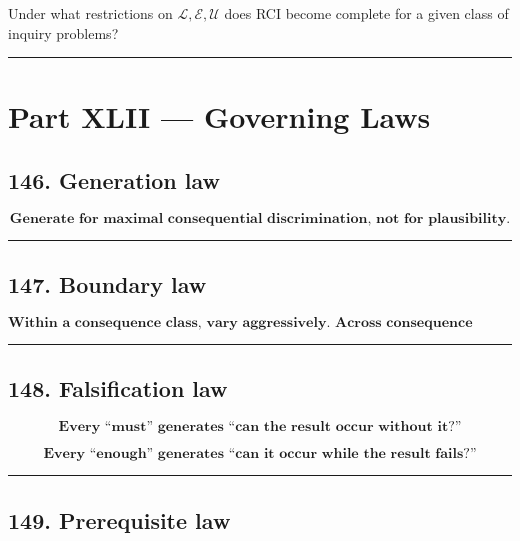 \documentclass[
]{article}
\begin{document}
Under what restrictions on \(\mathcal L,\mathcal E,\mathcal U\) does RCI
become complete for a given class of inquiry problems?

\begin{center}\rule{0.5\linewidth}{0.5pt}\end{center}

\section{Part XLII --- Governing Laws}\label{part-xlii-governing-laws}

\subsection{146. Generation law}\label{generation-law}

\[
\boxed{
\textbf{Generate for maximal consequential discrimination,
not for plausibility.}
}
\]

\begin{center}\rule{0.5\linewidth}{0.5pt}\end{center}

\subsection{147. Boundary law}\label{boundary-law}

\[
\boxed{
\textbf{Within a consequence class, vary aggressively.
Across consequence classes, change minimally.}
}
\]

\begin{center}\rule{0.5\linewidth}{0.5pt}\end{center}

\subsection{148. Falsification law}\label{falsification-law}

\[
\boxed{
\textbf{Every “must” generates “can the result occur without it?”}
}
\]

\[
\boxed{
\textbf{Every “enough” generates “can it occur while the result fails?”}
}
\]

\begin{center}\rule{0.5\linewidth}{0.5pt}\end{center}

\subsection{149. Prerequisite law}\label{prerequisite-law}
\end{document}
